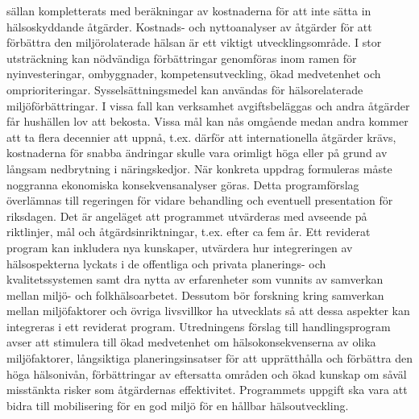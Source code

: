 sällan kompletterats med beräkningar av kostnaderna för att inte sätta in hälsoskyddande åtgärder. Kostnads- och nyttoanalyser av åtgärder för att förbättra den miljörolaterade hälsan är ett viktigt utvecklingsområde.
I stor utsträckning kan nödvändiga förbättringar genomföras inom ramen för nyinvesteringar, ombyggnader, kompetensutveckling, ökad medvetenhet och omprioriteringar. Sysselsättningsmedel kan användas för hälsorelaterade miljöförbättringar. I vissa fall kan verksamhet avgiftsbeläggas och andra åtgärder får hushällen lov att bekosta. Vissa mål kan nås omgående medan andra kommer att ta flera decennier att uppnå, t.ex. därför att internationella åtgärder krävs, kostnaderna för snabba ändringar skulle vara orimligt höga eller på grund av långsam nedbrytning i näringskedjor. När konkreta uppdrag formuleras måste noggranna ekonomiska konsekvensanalyser göras.
Detta programförslag överlämnas till regeringen för vidare behandling och eventuell presentation för riksdagen. Det är angeläget att programmet utvärderas med avseende på riktlinjer, mål och åtgärdsinriktningar, t.ex. efter ca fem år. Ett reviderat program kan inkludera nya kunskaper, utvärdera hur integreringen av hälsospekterna lyckats i de offentliga och privata planerings- och kvalitetssystemen samt dra nytta av erfarenheter som vunnits av samverkan mellan miljö- och folkhälsoarbetet. Dessutom bör forskning kring samverkan mellan miljöfaktorer och övriga livsvillkor ha utvecklats så att dessa aspekter kan integreras i ett reviderat program.
Utredningens förslag till handlingsprogram avser att stimulera till ökad medvetenhet om hälsokonsekvenserna av olika miljöfaktorer, långsiktiga planeringsinsatser för att upprätthålla och förbättra den höga hälsonivån, förbättringar av eftersatta områden och ökad kunskap om såväl misstänkta risker som åtgärdernas effektivitet. Programmets uppgift ska vara att bidra till mobilisering för en god miljö för en hållbar hälsoutveckling.

